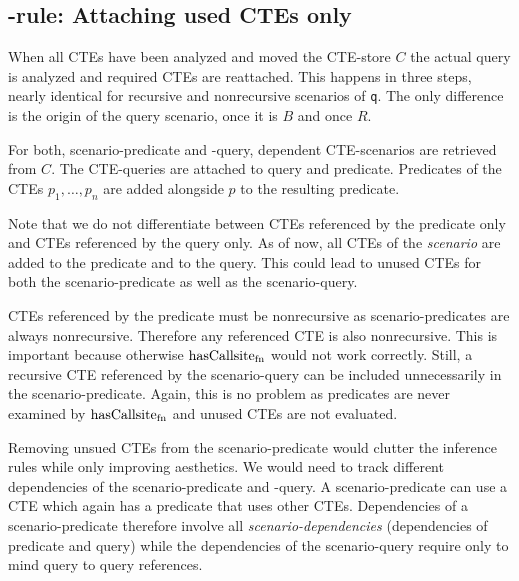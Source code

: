 \iffalse %
$$\inferrule{
    \hasCallsite(T, \WITH a_1 \AS t_1, ..., a_n \AS t_n~q)\\
    T, \varnothing \vdash (p, t_1) \rightarrow (B, R) \\
    ((B \times \{\bot\}) \cup (R \times \{\top\})) = \{(p'_{t_1}, t'_1, r_{i_1}), ..., (p'_{t_k}, t'_k, r_k)\} = X\\
    \forall (p'_t, t', r_i) \in X: T[a_1 \mapsto r_i], C[a_1: (t', p'_t, \deps(t')] \vdash (p, \WITH a_2 \AS t_2, ..., a_n \AS t_n~q) \rightarrow (B_i, R_i)
}{
    T, C \vdash (p, \WITH a_1 \AS t_1, ..., a_n \AS t_n~q) \rightarrow ((\cup_{1 \leq i \leq k} B_i), (\cup_{1 \leq j \leq k} R_j)\})
}\quad(\textsc{cte})$$
\fi

\subsection{{\normalfont\RWITH}-rule: Attaching used CTEs only}
When all CTEs have been analyzed and moved the CTE-store $C$ the actual query is analyzed and required CTEs are reattached. This happens in three steps, nearly identical for recursive and nonrecursive scenarios of \texttt{q}. The only difference is the origin of the query scenario, once it is $B$ and once $R$.

For both, scenario-predicate and -query, dependent CTE-scenarios are retrieved from $C$. The CTE-queries are attached to query and predicate. Predicates of the CTEs $p_1, \dots, p_n$ are added alongside $p$ to the resulting predicate.

Note that we do not differentiate between CTEs referenced by the predicate only and CTEs referenced by the query only. As of now, all CTEs of the \textit{scenario} are added to the predicate and to the query. This could lead to unused CTEs for both the scenario-predicate as well as the scenario-query.

CTEs referenced by the predicate must be nonrecursive as scenario-predicates are always nonrecursive. Therefore any referenced CTE is also nonrecursive. This is important because otherwise $\operatorname{\text{hasCallsite}_{fn}}$ would not work correctly. Still, a recursive CTE referenced by the scenario-query can be included unnecessarily in the scenario-predicate. Again, this is no problem as predicates are never examined by $\operatorname{\text{hasCallsite}_{fn}}$ and unused CTEs are not evaluated.

Removing unsued CTEs from the scenario-predicate would clutter the inference rules while only improving aesthetics. We would need to track different dependencies of the scenario-predicate and -query. A scenario-predicate can use a CTE which again has a predicate that uses other CTEs. Dependencies of a scenario-predicate therefore involve all \textit{scenario-dependencies} (dependencies of predicate and query) while the dependencies of the scenario-query require only to mind query to query references.

